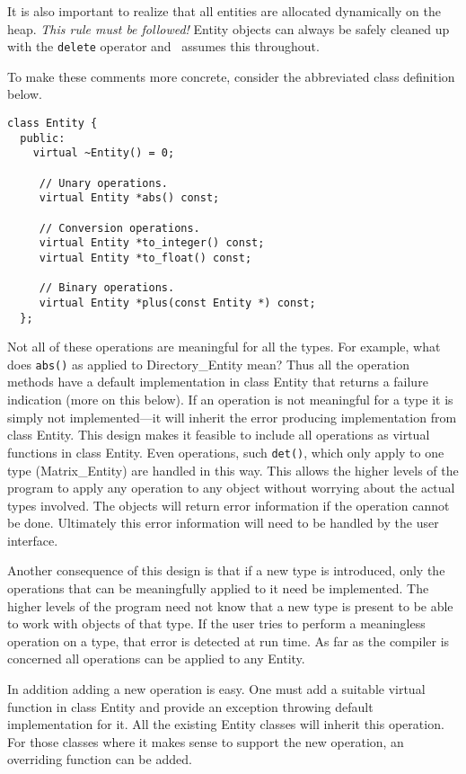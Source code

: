\documentclass{report}
\begin{document}
It is also important to realize that all entities are allocated dynamically on the heap.
\emph{This rule must be followed!} Entity objects can always be safely cleaned up with the
\texttt{delete} operator and \CLAC\ assumes this throughout.

To make these comments more concrete, consider the abbreviated class definition below.

\begin{verbatim}
class Entity {
  public:
    virtual ~Entity() = 0;

     // Unary operations.
     virtual Entity *abs() const;

     // Conversion operations.
     virtual Entity *to_integer() const;
     virtual Entity *to_float() const;

     // Binary operations.
     virtual Entity *plus(const Entity *) const;
  };
\end{verbatim}

Not all of these operations are meaningful for all the types. For example, what does
\texttt{abs()} as applied to Directory\_Entity mean? Thus all the operation methods have a
default implementation in class Entity that returns a failure indication (more on this below).
If an operation is not meaningful for a type it is simply not implemented---it will inherit the
error producing implementation from class Entity. This design makes it feasible to include all
operations as virtual functions in class Entity. Even operations, such \texttt{det()}, which
only apply to one type (Matrix\_Entity) are handled in this way. This allows the higher levels
of the program to apply any operation to any object without worrying about the actual types
involved. The objects will return error information if the operation cannot be done. Ultimately
this error information will need to be handled by the user interface.

Another consequence of this design is that if a new type is introduced, only the operations that
can be meaningfully applied to it need be implemented. The higher levels of the program need not
know that a new type is present to be able to work with objects of that type. If the user tries
to perform a meaningless operation on a type, that error is detected at run time. As far as the
compiler is concerned all operations can be applied to any Entity.

In addition adding a new operation is easy. One must add a suitable virtual function in class
Entity and provide an exception throwing default implementation for it. All the existing Entity
classes will inherit this operation. For those classes where it makes sense to support the new
operation, an overriding function can be added.
\end{document}
